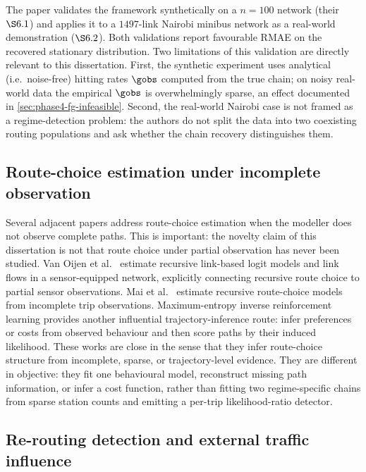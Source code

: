 The paper validates the framework synthetically on a $n=100$ network
(their $\S 6.1$) and applies it to a $1497$-link Nairobi minibus
network as a real-world demonstration ($\S 6.2$). Both validations report
favourable RMAE on the recovered stationary distribution. Two limitations
of this validation are directly relevant to this dissertation. First, the
synthetic experiment uses analytical (i.e.\ noise-free) hitting rates
$\gobs$ computed from the true chain; on noisy real-world data the
empirical $\gobs$ is overwhelmingly sparse, an effect documented in
\cref{sec:phase4-fg-infeasible}. Second, the real-world Nairobi case is
not framed as a regime-detection problem: the authors do not split the
data into two coexisting routing populations and ask whether the chain
recovery distinguishes them.

\subsection{Route-choice estimation under incomplete observation}
\label{sec:partial-route-prior}

Several adjacent papers address route-choice estimation when the
modeller does not observe complete paths. This is important: the novelty
claim of this dissertation is not that route choice under partial
observation has never been studied. Van Oijen et al.~\cite{vanoijen2020sensor}
estimate recursive link-based logit models and link flows in a
sensor-equipped network, explicitly connecting recursive route choice to
partial sensor observations. Mai et al.~\cite{mai2023incomplete}
estimate recursive route-choice models from incomplete trip
observations. Maximum-entropy inverse reinforcement learning
\cite{ziebart2008maxent} provides another influential trajectory-inference
route: infer preferences or costs from observed behaviour and then score
paths by their induced likelihood. These works are close in the sense
that they infer route-choice structure from incomplete, sparse, or
trajectory-level evidence. They are different in objective: they fit one
behavioural model, reconstruct missing path information, or infer a cost
function, rather than fitting two regime-specific chains from sparse
station counts and emitting a per-trip likelihood-ratio detector.

\subsection{Re-routing detection and external traffic influence}
\label{sec:rerouting-prior}

